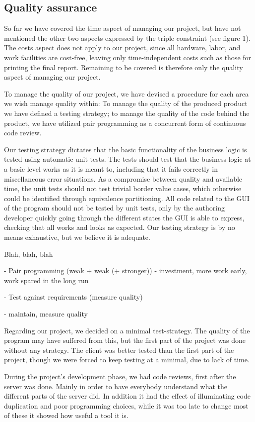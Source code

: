 \subsection{Quality assurance}

So far we have covered the time aspect of managing our project, but have not mentioned the other two aspects expressed by the triple constraint (see figure 1).
The costs aspect does not apply to our project, since all hardware, labor, and work facilities are cost-free, leaving only time-independent costs such as those for printing the final report.
Remaining to be covered is therefore only the quality aspect of managing our project.

To manage the quality of our project, we have devised a procedure for each area we wish manage quality within: To manage the quality of the produced product we have defined a testing strategy; to manage the quality of the code behind the product, we have utilized pair programming as a concurrent form of continuous code review.

Our testing strategy dictates that the basic functionality of the business logic is tested using automatic unit tests. The tests should test that the business logic at a basic level works as it is meant to, including that it fails correctly in miscellaneous error situations.
As a compromise between quality and available time, the unit tests should not test trivial border value cases, which otherwise could be identified through equivalence partitioning.
All code related to the GUI of the program should not be tested by unit tests, only by the authoring developer quickly going through the different states the GUI is able to express, checking that all works and looks as expected.
Our testing strategy is by no means exhaustive, but we believe it is adequate.



Blah, blah, blah

- Pair programming (weak + weak (+ stronger)) - investment, more work early, work spared in the long run

- Test against requirements (measure quality)


- maintain, measure quality






Regarding our project, we decided on a minimal test-strategy. The quality of the program may have suffered from this, but the first part of the project was done without any strategy. The client was better tested than the first part of the project, though we were forced to keep testing at a minimal, due to lack of time.

During the project's development phase, we had code reviews, first after the server was done. Mainly in order to have everybody understand what the different parts of the server did. In addition it had the effect of illuminating code duplication and poor programming choices, while it was too late to change most of these it showed how useful a tool it is.